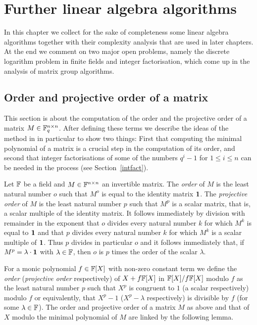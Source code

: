 
\chapter{Further linear algebra algorithms}
\label{chap:linalg}

In this chapter we collect for the sake of completeness some
linear algebra algorithms together with their complexity analysis
that are used in later chapters. At the end we comment on two major
open problems, namely the discrete logarithm problem in finite fields and
integer factorisation, which come up in the analysis of matrix group
algorithms.

\section{Order and projective order of a matrix}
\label{sec:orders}

This section is about the computation of the order and the projective
order of a matrix $M \in \mathbb{F}_q^{n \times n}$. After defining these 
terms we describe the 
ideas of the method in \cite{CellLeedOrder} in particular to show
two things: First that computing the minimal polynomial of a matrix
is a crucial step in the computation of its order, and second that
integer factorisations of some of the numbers $q^i-1$ for $1 \le i \le n$ 
can be needed in the process (see Section~\ref{intfact}).

\begin{DefProp}
Let $\mathbb{F}$ be a field and $M \in \mathbb{F}^{n \times
n}$ an invertible matrix. The \emph{order} of $M$ is the least natural
number $o$ such that $M^o$ is equal to the identity matrix\/ $\mathbf{1}$.
The \emph{projective order} of $M$ is the least natural number $p$
such that $M^p$ is a scalar matrix, that is, a scalar multiple of the
identity matrix. It follows immediately by division with remainder in
the exponent that $o$ divides every natural number $k$ for which 
$M^k$ is equal to\/ $\mathbf{1}$ and that $p$ divides every natural number $k$
for which $M^k$ is a scalar multiple of\/ $\mathbf{1}$. Thus $p$ divides in
particular $o$ and it follows immediately that, if $M^p = \lambda \cdot
\mathbf{1}$ with $\lambda \in \mathbb{F}$, then $o$ is $p$ times the order of the
scalar $\lambda$. \proofend
\end{DefProp}

For a monic polynomial $f \in \mathbb{F}[X]$ with non-zero constant term
we define the \emph{order} (\emph{projective order} respectively) of 
$X + f\mathbb{F}[X]$ in $\mathbb{F}[X]/f\mathbb{F}[X]$ modulo $f$ as the least natural 
number $p$ such that $X^p$ is congruent 
to $1$ (a scalar respectively) modulo $f$ or equivalently, that $X^p-1$ 
($X^p-\lambda$ respectively) is
divisible by $f$ (for some $\lambda \in \mathbb{F}$). 
The order and projective order
of a matrix $M$ as above and that of $X$ modulo the minimal polynomial 
of $M$ are linked by the following lemma.

